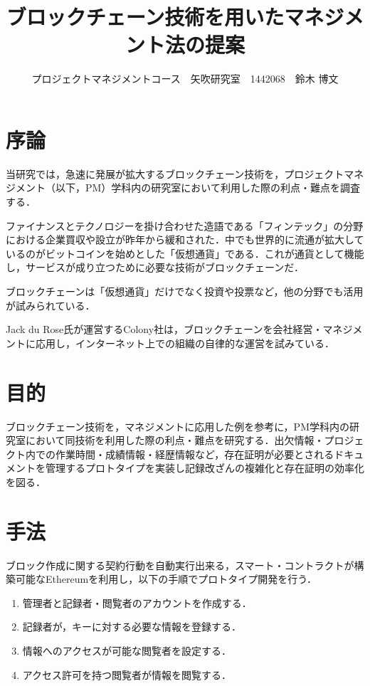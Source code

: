 \documentclass[uplatex,twocolumn,dvipdfmx]{jsarticle}
\title{\vspace{-5mm}\fontsize{14pt}{0pt}\selectfont ブロックチェーン技術を用いたマネジメント法の提案}
\author{\normalsize プロジェクトマネジメントコース　矢吹研究室　1442068　鈴木 博文}
\date{}
\begin{document}
\fontsize{10.5pt}{\baselineskip}\selectfont
\maketitle





\section{序論}\label{序論}

当研究では，急速に発展が拡大するブロックチェーン技術を，プロジェクトマネジメント（以下，PM）学科内の研究室において利用した際の利点・難点を調査する．

ファイナンスとテクノロジーを掛け合わせた造語である「フィンテック」の分野における企業買収や設立が昨年から緩和された\cite{touyou}．中でも世界的に流通が拡大しているのがビットコインを始めとした「仮想通貨」である．これが通貨として機能し，サービスが成り立つために必要な技術がブロックチェーンだ．

ブロックチェーンは「仮想通貨」だけでなく投資や投票など，他の分野でも活用が試みられている．

Jack du Rose氏が運営するColony社は，ブロックチェーンを会社経営・マネジメントに応用し，インターネット上での組織の自律的な運営を試みている\cite{wired}．

\section{目的}

ブロックチェーン技術を，マネジメントに応用した例を参考に，PM学科内の研究室において同技術を利用した際の利点・難点を研究する．出欠情報・プロジェクト内での作業時間・成績情報・経歴情報など，存在証明が必要とされるドキュメントを管理するプロトタイプを実装し記録改ざんの複雑化と存在証明の効率化を図る．

\section{手法}

ブロック作成に関する契約行動を自動実行出来る，スマート・コントラクトが構築可能なEthereumを利用し，以下の手順でプロトタイプ開発を行う．

\begin{enumerate}
\item 管理者と記録者・閲覧者のアカウントを作成する．
\item 記録者が，キーに対する必要な情報を登録する．
\item 情報へのアクセスが可能な閲覧者を設定する．
\item アクセス許可を持つ閲覧者が情報を閲覧する．
\end{enumerate}
\end{document}

